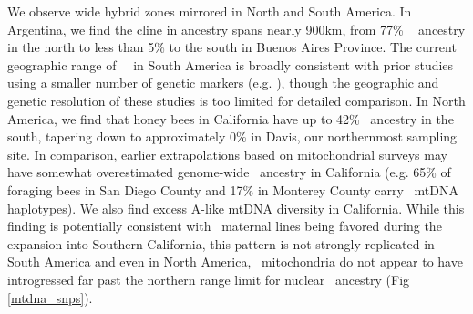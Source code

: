We observe wide hybrid zones mirrored in North and South America. In Argentina, we find the cline in ancestry spans nearly 900km, from 77\% \scutellata\  ancestry in the north to less than 5\% to the south in Buenos Aires Province. The current geographic range of \A\ \anc\ in South America is broadly consistent with prior studies using a smaller number of genetic markers (e.g. \cite{Sheppard:1991ep, Whitfield:2006eb, Abrahamovich:2015cw, Agra:2018ef}), though the geographic and genetic resolution of these studies is too limited for detailed comparison. In North America, we find that honey bees in California have up to 42\% \A\ ancestry in the south, tapering down to approximately 0\% in Davis, our northernmost sampling site. In comparison, earlier extrapolations based on mitochondrial surveys may have somewhat overestimated genome-wide \A\ ancestry in California (e.g. 65\% of foraging bees in San Diego County \cite{Kono:2015fi} and 17\% in Monterey County \cite{Lin:2018ha} carry \A\ mtDNA haplotypes). We also find excess A-like mtDNA diversity in California. While this finding is potentially consistent with \scutellata\ maternal lines being favored during the expansion into Southern California, this pattern is not strongly replicated in South America and even in North America, \A\ mitochondria do not appear to have introgressed far past the northern range limit for nuclear \A\ ancestry (Fig \ref{mtdna_snps}).

